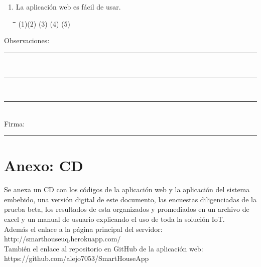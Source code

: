\begin{appendix}
\begin{enumerate}
	\item La aplicación web es fácil de usar.

\begin{tabbing}
	\hspace{2cm}\=\hspace{2cm}\=\hspace{2cm}\=\hspace{2cm}\=\kill
	(1)\>(2)  \>(3)  \>(4)  \>(5) 
\end{tabbing} 

\end{enumerate}

Observaciones: \rule{13.5cm}{0.1mm}\\
\rule{16.3cm}{0.1mm}\\
\rule{16.3cm}{0.1mm}\\

Firma: \rule{5cm}{0.1mm}

\chapter{Anexo: CD}\label{AnexoC}

Se anexa un CD con los códigos de la aplicación web y la aplicación del sistema embebido, una versión digital de este documento, las encuestas diligenciadas de la prueba beta, los resultados de esta organizados y promediados en un archivo de excel y un manual de usuario explicando el uso de toda la solución IoT.\\

Además el enlace a la página principal del servidor: http://smarthouseuq.herokuapp.com/\\

También el enlace al repositorio en GitHub de la aplicación web:\\ https://github.com/alejo7053/SmartHouseApp

\end{appendix}
